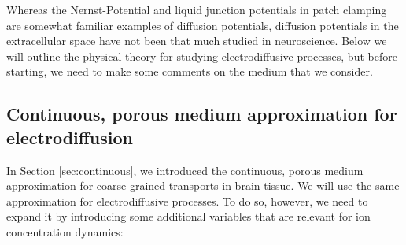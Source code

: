 Whereas the Nernst-Potential and liquid junction potentials in patch clamping are somewhat familiar examples of diffusion potentials, diffusion potentials in the extracellular space have not been that much studied in neuroscience. Below we will outline the physical theory for studying electrodiffusive processes, but before starting, we need to make some comments on the medium that we consider. 


\subsection{Continuous, porous medium approximation for electrodiffusion}
\label{sec:porous}
In Section \ref{sec:continuous}, we introduced the continuous, porous medium approximation for coarse grained transports in brain tissue. We will use the same approximation for electrodiffusive processes. To do so, however, we need to expand it by introducing some additional variables that are relevant for ion concentration dynamics:

